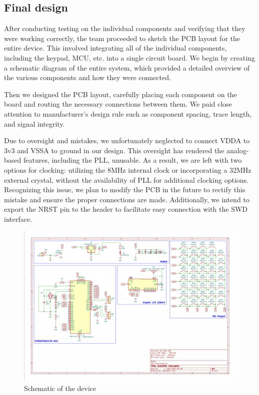 \documentclass[a4paper, twoside]{report}
\begin{document}
\subsection{Final design}
After conducting testing on the individual components and verifying that they were working correctly, the team proceeded to sketch the PCB layout for the entire device. This involved integrating all of the individual components, including the keypad, MCU, etc. into a single circuit board. We begin by creating a schematic diagram of the entire system, which provided a detailed overview of the various components and how they were connected.

Then we designed the PCB layout, carefully placing each component on the board and routing the necessary connections between them. We paid close attention to manufacturer's design rule such as component spacing, trace length, and signal integrity.

Due to oversight and mistakes, we unfortunately neglected to connect VDDA to 3v3 and VSSA to ground in our design. This oversight has rendered the analog-based features, including the PLL, unusable. As a result, we are left with two options for clocking: utilizing the 8MHz internal clock or incorporating a 32MHz external crystal, without the availability of PLL for additional clocking options. Recognizing this issue, we plan to modify the PCB in the future to rectify this mistake and ensure the proper connections are made. Additionally, we intend to export the NRST pin to the header to facilitate easy connection with the SWD interface.

\begin{figure}[H]
    \begin{center}
    \includegraphics[trim=0.1cm 0.1cm 0.1cm 0.1cm,clip, width=.8\textwidth]{PCB/pcb_schematic.pdf}
    \caption{Schematic of the device}
    \end{center} 
\end{figure}
\end{document}

